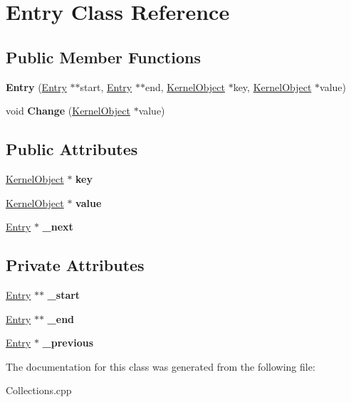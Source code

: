 \hypertarget{class_entry}{}\section{Entry Class Reference}
\label{class_entry}
\subsection*{Public Member Functions}
\begin{DoxyCompactItemize}
\item 
\mbox{\label{class_entry_a0b21b906d47583a54d4676495ea85012}} 
{\bfseries Entry} (\hyperlink{class_entry}{Entry} $\ast$$\ast$start, \hyperlink{class_entry}{Entry} $\ast$$\ast$end, \hyperlink{class_kernel_object}{Kernel\+Object} $\ast$key, \hyperlink{class_kernel_object}{Kernel\+Object} $\ast$value)
\item 
\mbox{\label{class_entry_ad81b59692d342f8f8de06f46a3921e91}} 
void {\bfseries Change} (\hyperlink{class_kernel_object}{Kernel\+Object} $\ast$value)
\end{DoxyCompactItemize}
\subsection*{Public Attributes}
\begin{DoxyCompactItemize}
\item 
\mbox{\label{class_entry_a56be933167cac18b9c5591a41d180739}} 
\hyperlink{class_kernel_object}{Kernel\+Object} $\ast$ {\bfseries key}
\item 
\mbox{\label{class_entry_a66559cc407bee32b494006d4014aa9af}} 
\hyperlink{class_kernel_object}{Kernel\+Object} $\ast$ {\bfseries value}
\item 
\mbox{\label{class_entry_ac2f98827296edee00ac27ea720a0e619}} 
\hyperlink{class_entry}{Entry} $\ast$ {\bfseries \+\_\+next}
\end{DoxyCompactItemize}
\subsection*{Private Attributes}
\begin{DoxyCompactItemize}
\item 
\mbox{\label{class_entry_a499af520da687360af294e2fdd51367c}} 
\hyperlink{class_entry}{Entry} $\ast$$\ast$ {\bfseries \+\_\+start}
\item 
\mbox{\label{class_entry_af041afc13e5ffe93bab70a0afe3960db}} 
\hyperlink{class_entry}{Entry} $\ast$$\ast$ {\bfseries \+\_\+end}
\item 
\mbox{\label{class_entry_a7a59c156aea6cff3e427df87479b2610}} 
\hyperlink{class_entry}{Entry} $\ast$ {\bfseries \+\_\+previous}
\end{DoxyCompactItemize}


The documentation for this class was generated from the following file\+:\begin{DoxyCompactItemize}
\item 
Collections.\+cpp\end{DoxyCompactItemize}
